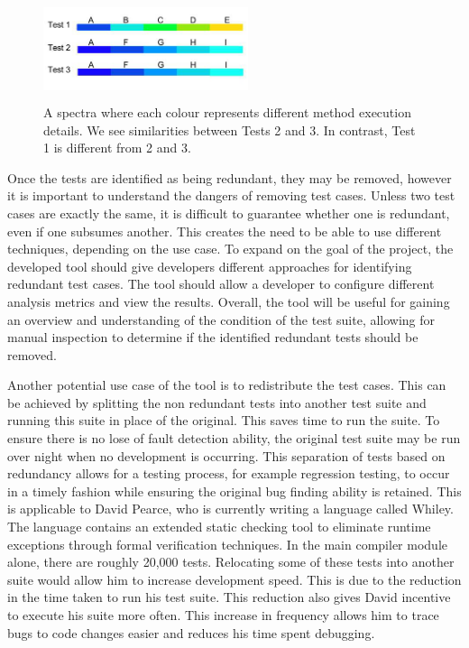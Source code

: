 \begin{figure}[h]
\centering
\includegraphics[width=6cm,height=3cm]{spectra.png}
\caption[A spectra showing different method executions]{A spectra where each colour represents different method execution details. We see similarities between Tests 2 and 3. In contrast, Test 1 is different from 2 and 3. }
\label{fig:spectra}
\end{figure}

Once the tests are identified as being redundant, they may be removed, however it is important to understand the dangers of removing test cases. Unless two test cases are exactly the same, it is difficult to guarantee whether one is redundant, even if one subsumes another. This creates the need to be able to use different techniques, depending on the use case. To expand on the goal of the project, the developed tool should give developers different approaches for identifying redundant test cases. The tool should allow a developer to configure different analysis metrics and view the results. Overall, the tool will be useful for gaining an overview and understanding of the condition of the test suite, allowing for manual inspection to determine if the identified redundant tests should be removed.

Another potential use case of the tool is to redistribute the test cases. This can be achieved by splitting the non redundant tests into another test suite and running this suite in place of the original. This saves time to run the suite. To ensure there is no lose of fault detection ability, the original test suite may be run over night when no development is occurring. This separation of tests based on redundancy allows for a testing process, for example regression testing, to occur in a timely fashion while ensuring the original bug finding ability is retained. This is applicable to David Pearce, who is currently writing a language called Whiley. The language contains an extended static checking tool to eliminate runtime exceptions through formal verification techniques. In the main compiler module alone, there are roughly 20,000 tests. Relocating some of these tests into another suite would allow him to increase development speed. This is due to the reduction in the time taken to run his test suite. This reduction also gives David incentive to execute his suite more often. This increase in frequency allows him to trace bugs to code changes easier and reduces his time spent debugging. 

